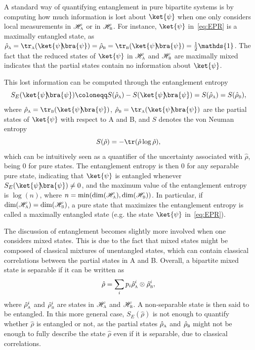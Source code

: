 \documentclass[letterpaper,12pt,titlepage,oneside,final]{book}
\newcommand{\openone}{\mathds{1}}
\renewcommand{\r}{\hat{\rho}}
\newcommand{\tc}[1]{\textsc{#1}}
\begin{document}
A standard way of quantifying entanglement in pure bipartite systems is by computing how much information is lost about $\ket{\psi}$ when one only considers local measurements in $\mathscr{H}_\tc{a}$ or in $\mathscr{H}_\tc{b}$. For instance, $\ket{\psi}$ in~\eqref{eq:EPR} is a maximally entangled state, as $\r_\tc{a} = \tr_\tc{a}(\ket{\psi}\!\!\bra{\psi}) = \r_\tc{b} = \tr_\tc{b}(\ket{\psi}\!\!\bra{\psi}) = \frac{1}{2}\openone$. The fact that the reduced states of $\ket{\psi}$ in $\mathscr{H}_\tc{a}$ and $\mathscr{H}_\tc{b}$ are maximally mixed indicates that the partial states contain no information about $\ket{\psi}$.

This lost information can be computed through the entanglement entropy
\begin{equation}
    S_E(\ket{\psi}\!\!\bra{\psi}) \coloneqq S(\hat{\rho}_\tc{a}) - S(\ket{\psi}\!\!\bra{\psi}) = S(\hat{\rho}_\tc{a}) = S(\hat{\rho}_\tc{b}),
\end{equation}
where $\hat{\rho}_\tc{a} =  \tr_\tc{b}(\ket{\psi}\!\!\bra{\psi})$, $\hat{\rho}_\tc{b} =  \tr_\tc{a}(\ket{\psi}\!\!\bra{\psi})$ are the partial states of $\ket{\psi}$ with respect to A and B, and $S$ denotes the von Neuman entropy
\begin{equation}
    S(\hat{\rho}) = - \tr(\hat{\rho}\log\hat{\rho}),
\end{equation}
which can be intuitively seen as a quantifier of the uncertainty associated with $\hat{\rho}$, being $0$ for pure states. The entanglement entropy is then $0$ for any separable pure state, indicating that $\ket{\psi}$ is entangled whenever $S_E(\ket{\psi}\!\!\bra{\psi})\neq 0$, and the maximum value of the entanglement entropy is $\log(n)$, where $n = \min(\text{dim}(\mathscr{H}_\tc{a}),\text{dim}(\mathscr{H}_\tc{b}))$. In particular, if $\text{dim}(\mathscr{H}_\tc{a})=\text{dim}(\mathscr{H}_\tc{b})$, a pure state that maximizes the entanglement entropy is called a maximally entangled state (e.g. the state $\ket{\psi}$ in~\eqref{eq:EPR}).

The discussion of entanglement becomes slightly more involved when one considers mixed states. This is due to the fact that mixed states might be composed of classical mixtures of unentangled states, which can contain classical correlations between the partial states in A and B. Overall, a bipartite mixed state is separable if it can be written as
\begin{equation}
    \hat{\rho} = \sum_i p_i \r_\tc{a}^i \otimes \r_\tc{b}^i,
\end{equation}
where $\r_\tc{a}^i$ and $\r_\tc{b}^i$ are states in $\mathscr{H}_\tc{a}$ and $\mathscr{H}_\tc{b}$. A non-separable state is then said to be entangled. In this more general case, $S_E(\hat{\rho})$ is not enough to quantify whether $\r$ is entangled or not, as the partial states $\r_\tc{a}$ and $\r_\tc{b}$ might not be enough to fully describe the state $\r$ even if it is separable, due to classical correlations. 
\end{document}
